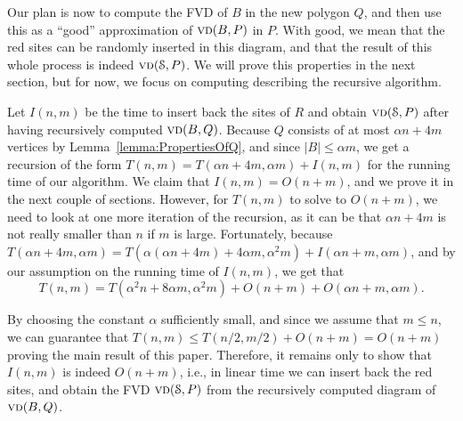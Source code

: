 \documentclass[a4paper,UKenglish]{socg-lipics-v2018}
\newcommand{\s}{\mathcal S}
\newcommand{\vd}[2][P]{\textsc{vd}(#2, #1)}
\newcommand{\bvd}[2][P]{\textsc{vd}_{\partial}(#2, #1)}
\newcommand{\LL}[1][\s, P]{\ensuremath{\mathcal L_{_{#1}}}}
\newcommand{\A}{\ensuremath{\mathcal A}}
\begin{document}
Our plan is now to compute the FVD of $B$ in the new polygon $Q$, and then use this as a ``good'' approximation of $\vd{B}$ in $P$. 
With good, we mean that the red sites can be randomly inserted in this diagram, and that the result of this whole process is indeed $\vd{\s}$. 
We will prove this properties in the next section, but for now, we focus on computing describing the recursive algorithm.

Let $I(n,m)$ be the time to insert back the sites of $R$ and obtain $\vd{\s}$ after having recursively computed $\vd[Q]{B}$.
Because $Q$ consists of at most $\alpha n + 4m$ vertices by Lemma~\ref{lemma:PropertiesOfQ}, and since $|B|\leq \alpha m$, we get a recursion of the form $T(n, m) = T(\alpha n + 4m, \alpha m) + I(n,m)$ for the running time of our algorithm. 
We claim that $I(n,m) = O(n+m)$, and we prove it in the next couple of sections.
However, for $T(n,m)$ to solve to $O(n+ m)$, we need to look at one more iteration of the recursion, as it can be that $\alpha n + 4m$ is not really smaller than $n$ if $m$ is large. 
Fortunately, because $T(\alpha n + 4m, \alpha m) = T(\alpha(\alpha n + 4m) + 4\alpha m, \alpha^2 m) + I(\alpha n + m, \alpha m)$, and by our assumption on the running time of $I(n,m)$, we get that
$$T(n,m) = T(\alpha^2 n + 8\alpha m, \alpha^2 m) + O(n+m) + O(\alpha n + m, \alpha m).$$

By choosing the constant $\alpha$ sufficiently small, and since we assume that $m\leq n$, we can guarantee that $T(n, m) \leq T(n/2, m/2) + O(n + m) = O(n +m)$ proving the main result of this paper.
Therefore, it remains only to show that $I(n,m)$ is indeed $O(n+ m)$, i.e., in linear time we can insert back the red sites, and obtain the FVD $\vd{\s}$ from the recursively computed diagram of $\vd[Q]{B}$.
\end{document}
